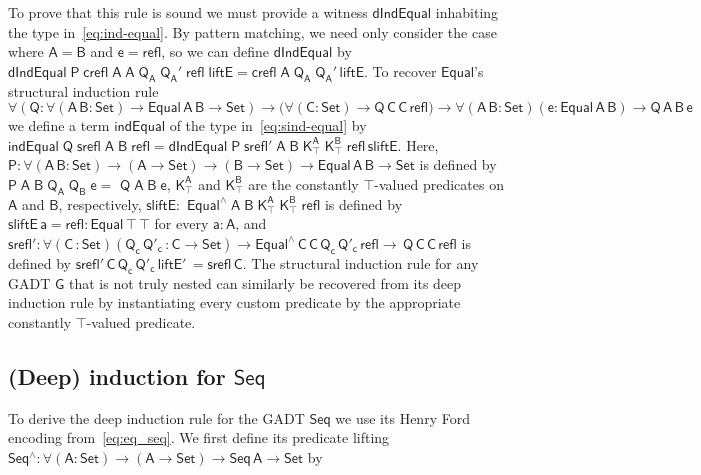 \documentclass[9pt]{entcs}
\begin{document}
To prove that this rule is sound we must provide a witness
$\mathsf{dIndEqual}$ inhabiting the type in~\eqref{eq:ind-equal}.  By
pattern matching, we need only consider the case where $\mathsf{A} =
\mathsf{B}$ and $\mathsf{e} = \mathsf{refl}$, so we can define
$\mathsf{dIndEqual}$ by
$\mathsf{dIndEqual\;P\;crefl\;A\;A\;Q_A\;Q_A'\;refl\;liftE =
  crefl\;A\;Q_A\;Q_A'\,liftE}$. To recover $\mathsf{Equal}$'s structural
induction rule
\begin{equation}\label{eq:sind-equal}
\mathsf{\forall (Q : \forall (A\,B : Set)
  \to Equal\,A\,B \to Set) \to \big( \forall (C : Set) \to
  Q\,C\,C\,refl \big) \to \forall (A\,B : Set) (e: Equal\,A\,B) \to
  Q\,A\,B\,e}
\end{equation}
we define a term $\mathsf{indEqual}$ of the type
in~\eqref{eq:sind-equal} by $\mathsf{indEqual\;Q\;srefl\;A\;B\;refl =
  dIndEqual\;P\;srefl'\;A\;B\;
  K^A_\top\;K^B_\top\;refl\,sliftE}$. Here, $\mathsf{P : \forall (A\,B
  : Set) \to (A \to Set) \to (B \to Set) \to Equal\,A\,B \to Set}$ is
defined by $\mathsf{P\;A\;B\;Q_A\;Q_B\;e =}$ $\mathsf{Q\;A\;B\;e}$,
$\mathsf{K^A_\top}$ and $\mathsf{K^B_\top}$ are the constantly
$\mathsf{\top}$-valued predicates on $\mathsf{A}$ and $\mathsf{B}$,
respectively, $\mathsf{sliftE :}$ $\mathsf{Equal^{\wedge}\;A\;B\;
  K^A_\top\;K^B_\top\;refl}$ is defined by $\mathsf{sliftE\,a = refl :
  Equal\, \top\,\top}$ for every $\mathsf{a : A}$, and $\mathsf{srefl'
  : \forall (C\,: Set) (Q_c\,Q'_c\, : C \to Set) \to
  Equal^{\wedge}\,C\,C\,Q_c\,Q'_c\,refl \to \,Q\,C\,C\,refl}$ is
defined by $\mathsf{srefl'\,C\,Q_c\,Q'_c\,liftE'\,=srefl\, C}$.  The
structural induction rule for any GADT $\mathsf{G}$ that is not truly
nested can similarly be recovered from its deep induction rule by
instantiating every custom predicate by the appropriate constantly
$\mathsf{\top}$-valued predicate.

\subsection{(Deep) induction for $\mathsf{Seq}$}\label{sec:ind-seq}

To derive the deep induction rule for the GADT $\mathsf{Seq}$ we use
its Henry Ford encoding from~\eqref{eq:eq_seq}.  We first define its
predicate lifting $\mathsf{Seq^\wedge : \forall (A : Set) \to (A \to
  Set) \to Seq\,A \to Set}$ by

\vspace*{-0.2in}
\end{document}
